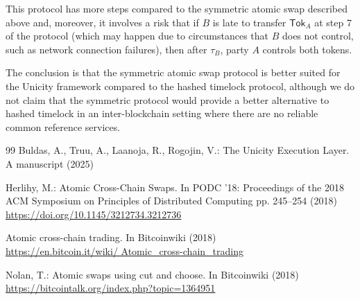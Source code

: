 \documentclass{article}
\begin{document}
\noindent This protocol has more steps compared to the symmetric atomic swap described above and, moreover, it involves a risk that if $B$ is late to transfer $\mathsf{Tok}_A$ at step 7 of the protocol (which may happen due to circumstances that $B$ does not control, such as network connection failures), then after $\tau_B$, party $A$ controls both tokens.

The conclusion is that the symmetric atomic swap protocol is better suited for the Unicity framework compared to the hashed timelock protocol, although we do not claim that the symmetric protocol would provide a better alternative to hashed timelock in an inter-blockchain setting where there are no reliable common reference services.



\begin{thebibliography}{99}
Buldas, A., Truu, A., Laanoja, R., Rogojin, V.:
The Unicity Execution Layer. A manuscript (2025) {\url{}}

Herlihy, M.:
Atomic Cross-Chain Swaps.
In PODC '18:
Proceedings of the 2018 ACM Symposium on Principles of Distributed Computing
pp. 245--254 (2018)
\textcolor{blue}{\small
\url{https://doi.org/10.1145/3212734.3212736}}

Atomic cross-chain trading.
In Bitcoinwiki (2018)\\
\textcolor{blue}{\small\url{https://en.bitcoin.it/wiki/
Atomic_cross-chain_trading}}

Nolan, T.: Atomic swaps using cut and choose. In Bitcoinwiki (2018)\\
\textcolor{blue}{\small
\url{https://bitcointalk.org/index.php?topic=1364951}}

\end{thebibliography}
\pagebreak
\appendix
\end{document}
